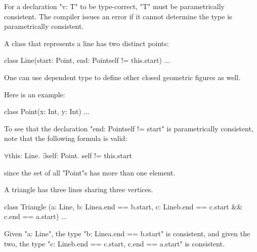 \begin{staticrule*}
For a declaration \xcd"v: T" to be type-correct, \xcd"T" must be parametrically
consistent. The compiler issues an error if it cannot determine
the type is parametrically consistent.
\end{staticrule*}

\begin{example}

A class that represents a line has two distinct points:

\begin{xten}
class Line(start: Point, 
           end: Point{self != this.start}) {...}      
\end{xten}
\end{example}

One can use dependent type to define other closed geometric figures as well.

\begin{example}
Here is an example:
\begin{xten}
class Point(x: Int, y: Int) {...}
\end{xten}


To see that the declaration \xcd"end: Point{self != start}" is
parametrically consistent, note that the following formula is valid:
\begin{xtenmath}
$\forall$this: Line. $\exists$self: Point. self != this.start  
\end{xtenmath}
\noindent since the set of all \xcd"Point"s has more than one element.
\end{example}

\begin{example}
A triangle has three lines sharing three vertices.
\begin{xten}
class Triangle 
 (a: Line, 
  b: Line{a.end == b.start}, 
  c: Line{b.end == c.start && c.end == a.start}) 
 { ... }
\end{xten}


Given \xcd"a: Line", the type \xcd"b: Line{a.end == b.start}" is consistent,
and
given the two, the type \xcd"c: Line{b.end == c.start, c.end == a.start}"
is consistent.

\end{example}

